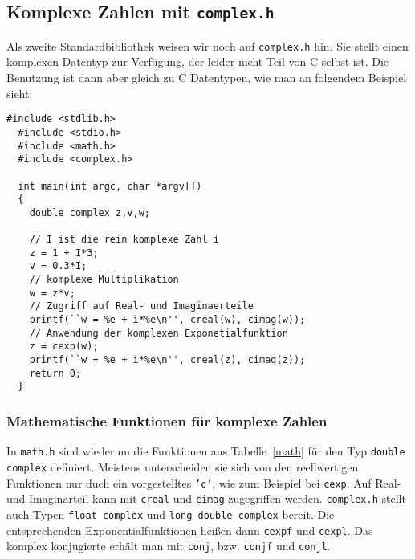 \subsection{Komplexe Zahlen mit \texttt{complex.h}}

Als zweite Standardbibliothek weisen wir noch auf \texttt{complex.h} hin.
Sie stellt einen komplexen Datentyp zur Verfügung, der leider nicht Teil von C selbst ist.
Die Benutzung ist dann aber gleich zu C Datentypen, wie man an folgendem Beispiel sieht:
\begin{lstlisting}[caption={Beispiel für komplexe Zahlen}, belowcaptionskip=0.3em]
  #include <stdlib.h>
  #include <stdio.h>
  #include <math.h>
  #include <complex.h>
  
  int main(int argc, char *argv[])
  {
    double complex z,v,w;

    // I ist die rein komplexe Zahl i
    z = 1 + I*3;
    v = 0.3*I;
    // komplexe Multiplikation
    w = z*v;
    // Zugriff auf Real- und Imaginaerteile
    printf(``w = %e + i*%e\n'', creal(w), cimag(w));
    // Anwendung der komplexen Exponetialfunktion
    z = cexp(w);
    printf(``w = %e + i*%e\n'', creal(z), cimag(z));
    return 0;
  }
\end{lstlisting}

\subsubsection{Mathematische Funktionen für komplexe Zahlen}

In \texttt{math.h} sind wiederum die Funktionen aus Tabelle~\ref{math} für den Typ \texttt{double complex} definiert.
Meistens unterscheiden sie sich von den reellwertigen Funktionen nur duch ein vorgestelltes \texttt{'c'}, wie zum Beispiel bei \texttt{cexp}.
Auf Real- und Imaginärteil kann mit \texttt{creal} und \texttt{cimag} zugegriffen werden.
\texttt{complex.h} stellt auch Typen \texttt{float complex} und \texttt{long double complex} bereit.
Die entsprechenden Exponentialfunktionen heißen dann \texttt{cexpf} und \texttt{cexpl}.
Das komplex konjugierte erhält man mit \texttt{conj}, bzw. \texttt{conjf} und \texttt{conjl}.
